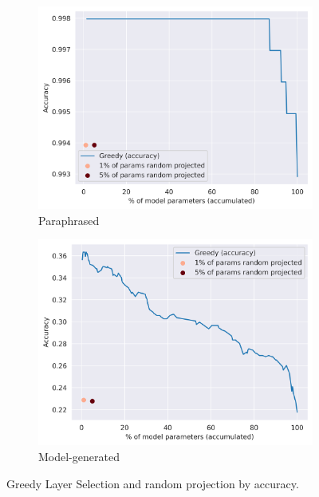 \begin{figure}[H]
    \centering
    \begin{subfigure}[h]{0.49\textwidth}
        \centering
        \includegraphics[width=\textwidth]{figures/results/paraphrased/greedy_layer_selection_accuracy.png}
        \caption{Paraphrased}
        \label{fig:greedy_layer_selection_accuracy_paraphrased}
    \end{subfigure}
    \hfill
    \begin{subfigure}[h]{0.49\textwidth}
        \centering
        \includegraphics[width=\textwidth]{figures/results/model-generated/greedy_layer_selection_accuracy.png}
        \caption{Model-generated}
        \label{fig:greedy_layer_selection_accuracy_model_generated}
    \end{subfigure}
    \caption{Greedy Layer Selection and random projection by accuracy.}
    \label{fig:greedy_layer_selection_accuracy}
\end{figure}

